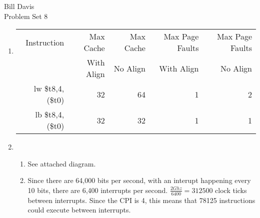 \documentclass[11pt,fleqn]{article}
\begin{document}
\newcommand{\mbf}[1]{\mbox{{\bfseries #1}}}
\newcommand{\N}{\mbf{N}}
\renewcommand{\O}{\mbf{O}}

\noindent Bill Davis \\
 Problem Set 8
\begin{enumerate}
\item %
\begin{tabular}{|r|r|r|r|r|}
  \hline
Instruction & Max Cache  & Max Cache  & Max Page Faults & Max Page Faults\\
 & With Align & No Align & With Align &  No Align \\ 
\hline
lw \$t8,4,(\$t0) & 32 & 64 & 1  & 2 \\
lb \$t8,4,(\$t0) & 32 & 32 & 1  & 1 \\
\hline
\end{tabular} 

\item %
 \begin{enumerate}
 \item See attached diagram.
 \item Since there are 64,000 bits per second, with an interupt happening every 10 bits, there are 6,400 interrupts per second. $\frac{2 Ghz}{6400} = 312500$ clock ticks between interrupts. Since the CPI is 4, this means that 78125 instructions could execute between interrupts. 
 

\end{enumerate}
\end{enumerate}
\end{document}
